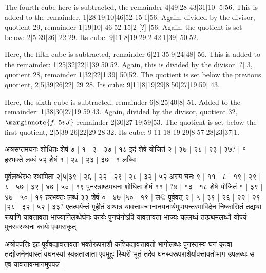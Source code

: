 \documentclass[12pt]{book}
\def\danda{$|$}
\begin{document}
The fourth cube here is subtracted, the remainder 4\danda 49\danda 28 43\danda 31\danda 10\danda
5\danda 56. This is added to the remainder, 1\danda 28\danda 19\danda 10\danda 46\danda 52
15\danda 1\danda 56. Again, divided by the divisor, quotient 29, remainder 1\danda 19\danda 10\danda
46\danda 52 15\danda 2 [?] \danda 56. Again, the quotient is set below: 2\danda 5\danda 39\danda 26\danda
22\danda 29. Its cube: 9\danda 11\danda 8\danda 19\danda 29\danda 2\danda 42\danda 1\danda 39\danda
50\danda 52. 

Here, the fifth cube is subtracted, remainder 6\danda 21\danda 35\danda 9\danda 24\danda 48\danda
56. This is added to the remainder: 1\danda 25\danda 32\danda 22\danda 1\danda 39\danda 50\danda 52.
Again, this is divided by the divisor [?] 3, quotient 28, remainder 1\danda 32\danda 22\danda 1\danda 39\danda
50\danda 52. The quotient is set below the previous quotient, 2\danda 5\danda 39\danda 26\danda 22\danda
29 28. Its cube: 9\danda 11\danda 8\danda 19\danda 29\danda 8\danda 50\danda 27\danda 19\danda 59\danda
43. 

Here, the sixth cube is subtracted, remainder 6\danda 8\danda 25\danda 40\danda 8\danda
51. Added to the remainder: 1\danda 38\danda 30\danda 27\danda 19\danda 59\danda 43. Again, divided 
by the divisor, quotient 32,
$\marginnote{f.~5v J}$
remainder 2\danda 30\danda 27\danda 19\danda 59\danda 53. The quotient is set below the first
quotient, 2\danda 5\danda 39\danda 26\danda 22\danda 29\danda 28\danda 32. Its cube: 
9\danda 11 18 19\danda 29\danda 8\danda 57\danda 28\danda 23\danda 37\danda 1.

\newpage


{\s अत्रसप्तमघनः शोधितः शेषं ७ | १ | ३ | ३७ | १८ इदं शेषे योजितं २ | ३७ | २८ | २३ | ३७? | १ हरभक्ते लब्धं ५२ शेषं १ | २८ | २३ | ३७ | १ लब्धिः

पूर्वलब्धेरधः स्थापिता २|५|३९ | २६ | २२ | २९ | २८ | ३२ | ५२ अस्य घनः ९ | ११ | ८ | १९ | २९ | ८ | ५७ | ३९ | ४७ | ५० | १९ पुनरत्राष्टमघनः शोधितः शेषं ११ | ?४ | १३ | १८
शेषे योजितं १ | ३९ | ४७ | ५० | १९ हरभक्तः लब्धं ३३ शेषं ० | ४७ |५० | १९ | 
ल@
पूर्ववत् २ | ५ | ३९ | २६ | २२ | २९ |२८ | ३२ | ५२ | ३३? एतत्पर्यन्तं गृहीतं अथात्र यावत्तावन्मानानयनार्थमुपायन्तरमाविदेन निष्कासितं तद्यथा रूपाणि यावत्तावता भाज्यानिलब्धेर्घनः कार्यः पुनर्घनोऽपि यावत्तावता भाज्यः यल्लब्धं तत्प्रथमलब्धौ योज्यं पुनस्वस्य्घनः कार्यः एवमसकृत्

अत्रोपपत्तिः
इह पूर्ववद्यावत्तावता भक्तेरूपराशौ कश्चिद्यावत्तावतो भागोलब्धः पुनस्तस्य घनं कृत्वा
तद्योजनेनवास्तं वघनस्यां स्वन्नताजाता एवमुहुः स्थिरी भूतं तदेव घनस्वरूपराशेर्यावत्तावतोभाग उपलब्धः स एव-यावत्तावन्मानमुपपन्नं |}
\end{document}
